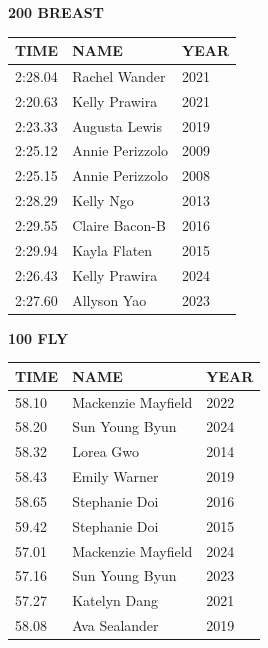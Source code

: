 \begin{table}[H]
\centering
\begin{minipage}[t]{0.48\textwidth}
\centering
\textbf{200 BREAST}\\[0.1cm]
\begin{tabular}{@{}p{1.8cm}p{2.8cm}p{1.2cm}@{}}
\hline
    \textbf{TIME} & \textbf{NAME} & \textbf{YEAR} \\
\hline
    2:28.04 & Rachel Wander & 2021 \\
    2:20.63 & Kelly Prawira & 2021 \\
    2:23.33 & Augusta Lewis & 2019 \\
    2:25.12 & Annie Perizzolo & 2009 \\
    2:25.15 & Annie Perizzolo & 2008 \\
    2:28.29 & Kelly Ngo & 2013 \\
    2:29.55 & Claire Bacon-B & 2016 \\
    2:29.94 & Kayla Flaten & 2015 \\
    2:26.43 & Kelly Prawira & 2024 \\
    2:27.60 & Allyson Yao & 2023 \\
\hline
\end{tabular}
\end{minipage}\hfill
\begin{minipage}[t]{0.48\textwidth}
\centering
\textbf{100 FLY}\\[0.1cm]
\begin{tabular}{@{}p{1.8cm}p{2.8cm}p{1.2cm}@{}}
\hline
    \textbf{TIME} & \textbf{NAME} & \textbf{YEAR} \\
\hline
    58.10 & Mackenzie Mayfield & 2022 \\
    58.20 & Sun Young Byun & 2024 \\
    58.32 & Lorea Gwo & 2014 \\
    58.43 & Emily Warner & 2019 \\
    58.65 & Stephanie Doi & 2016 \\
    59.42 & Stephanie Doi & 2015 \\
    57.01 & Mackenzie Mayfield & 2024 \\
    57.16 & Sun Young Byun & 2023 \\
    57.27 & Katelyn Dang & 2021 \\
    58.08 & Ava Sealander & 2019 \\
\hline
\end{tabular}
\end{minipage}
\end{table}

